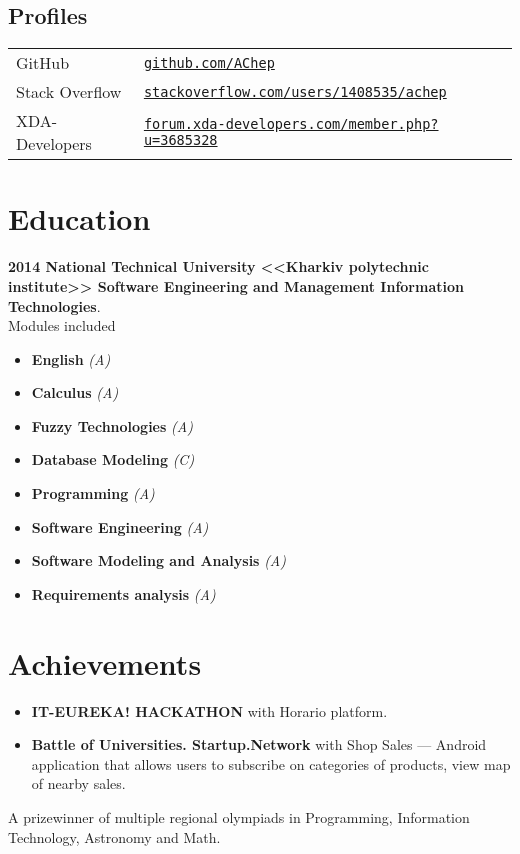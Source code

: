 \documentclass[a4paper]{article}
\begin{document}
	\subsection*{Profiles}
	\begin{tabular}{@{}ll}
		GitHub & \href{https://github.com/AChep}{\texttt{github.com/AChep}} \\
		Stack Overflow & \href{https://stackoverflow.com/users/1408535/achep}{\texttt{stackoverflow.com/users/1408535/achep}} \\
		XDA-Developers & \href{https://forum.xda-developers.com/member.php?u=3685328}{\texttt{forum.xda-developers.com/member.php?u=3685328}} \\
	\end{tabular}

	\section*{Education}
	\textbf{2014 National Technical University <<Kharkiv polytechnic institute>> Software Engineering and Management Information Technologies}. \\
	Modules included 
	\begin{multicols}{2}
	\begin{itemize}
		\item \textbf{English} \textit{(A)}
		\item \textbf{Calculus} \textit{(A)}
		\item \textbf{Fuzzy Technologies} \textit{(A)}
		\item \textbf{Database Modeling} \textit{(C)}
		\item \textbf{Programming} \textit{(A)}
		\item \textbf{Software Engineering} \textit{(A)}
		\item \textbf{Software Modeling and Analysis} \textit{(A)}
		\item \textbf{Requirements analysis} \textit{(A)}
	\end{itemize}
	\end{multicols}

	\section*{Achievements}
	\begin{itemize}
		\item \textbf{IT-EUREKA! HACKATHON} with Horario platform.
		\item \textbf{Battle of Universities. Startup.Network} with Shop Sales --- Android application that allows users to subscribe on categories of products, view map of nearby sales.
	\end{itemize}
	A prizewinner of multiple regional olympiads in Programming, Information Technology, Astronomy and Math. 
\end{document}
